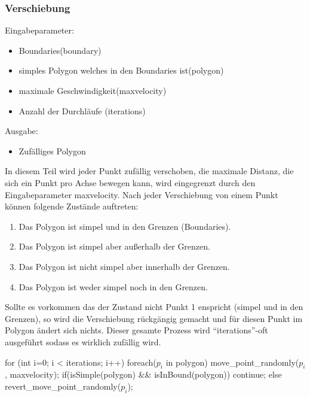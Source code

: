   \subsubsection{Verschiebung}
    Eingabeparameter: 
    \begin{itemize}
      \item Boundaries(boundary)
      \item simples Polygon welches in den Boundaries ist(polygon)
      \item maximale Geschwindigkeit(maxvelocity)
      \item Anzahl der Durchläufe (iterations)
    \end{itemize}
    Ausgabe:
    \begin{itemize}
      \item Zufälliges Polygon
    \end{itemize}
    In diesem Teil wird jeder Punkt zufällig verschoben, die maximale 
    Distanz, die sich ein Punkt pro Achse bewegen kann, wird eingegrenzt 
    durch den Eingabeparameter maxvelocity. Nach jeder Verschiebung von 
    einem Punkt können folgende Zustände auftreten:
    \begin{enumerate}
      \item Das Polygon ist simpel und in den Grenzen (Boundaries).
      \item Das Polygon ist simpel aber außerhalb der Grenzen.
      \item Das Polygon ist nicht simpel aber innerhalb der Grenzen.
      \item Das Polygon ist weder simpel noch in den Grenzen.
    \end{enumerate}
    Sollte es vorkommen das der Zustand nicht Punkt 1 enspricht (simpel 
    und in den Grenzen), so wird die Verschiebung rückgängig gemacht und 
    für diesen Punkt im Polygon ändert sich nichts.
    Dieser gesamte Prozess wird \enquote{iterations}-oft ausgeführt sodass 
    es wirklich zufällig wird.

\begin{code}[caption={Pseudocode},mathescape=true]
for (int i=0; i < iterations; i++)
{
  foreach($p_i$ in polygon)
  {
    move_point_randomly($p_i$, maxvelocity);
    if(isSimple(polygon) && isInBound(polygon))
      continue;
    else
      revert_move_point_randomly($p_i$);
  }
}
\end{code}

